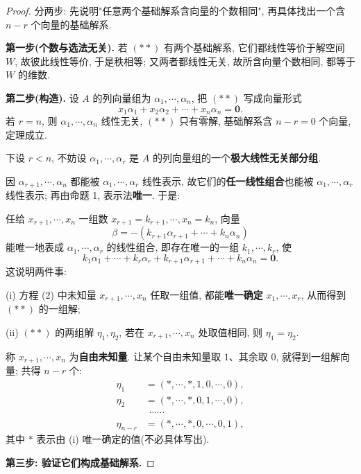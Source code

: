 \documentclass[UTF8,11pt]{ctexart}
\theoremstyle{cnthm}
\begin{document}
\begin{proof}
分两步: 先说明"任意两个基础解系含向量的个数相同", 再具体找出一个含 $n-r$ 个向量的基础解系.

\textbf{第一步(个数与选法无关).} 若 $(**)$ 有两个基础解系, 它们都线性等价于解空间 $W$, 故彼此线性等价, 于是秩相等; 又两者都线性无关, 故所含向量个数相同, 都等于 $W$ 的维数.

\textbf{第二步(构造).} 设 $A$ 的列向量组为 $\alpha_1,\cdots,\alpha_n$, 把 $(**)$ 写成向量形式
\begin{equation*}
x_1\alpha_1+x_2\alpha_2+\cdots+x_n\alpha_n=\mathbf 0 .\tag{2}
\end{equation*}
若 $r=n$, 则 $\alpha_1,\cdots,\alpha_n$ 线性无关, $(**)$ 只有零解, 基础解系含 $n-r=0$ 个向量, 定理成立.

下设 $r<n$, 不妨设 $\alpha_1,\cdots,\alpha_r$ 是 $A$ 的列向量组的一个\textbf{极大线性无关部分组}.

因 $\alpha_{r+1},\cdots,\alpha_n$ 都能被 $\alpha_1,\cdots,\alpha_r$ 线性表示, 故它们的\textbf{任一线性组合}也能被 $\alpha_1,\cdots,\alpha_r$ 线性表示; 再由命题 1, 表示法\textbf{唯一}. 于是:

任给 $x_{r+1},\cdots,x_n$ 一组数 $x_{r+1}=k_{r+1},\cdots,x_n=k_n$, 向量
\[
\beta=-(k_{r+1}\alpha_{r+1}+\cdots+k_n\alpha_n)
\]
能唯一地表成 $\alpha_1,\cdots,\alpha_r$ 的线性组合, 即存在唯一的一组 $k_1,\cdots,k_r$, 使
\[
k_1\alpha_1+\cdots+k_r\alpha_r+k_{r+1}\alpha_{r+1}+\cdots+k_n\alpha_n=\mathbf 0 .
\]
这说明两件事:

(i) 方程 (2) 中未知量 $x_{r+1},\cdots,x_n$ 任取一组值, 都能\textbf{唯一确定} $x_1,\cdots,x_r$, 从而得到 $(**)$ 的一组解;

(ii) $(**)$ 的两组解 $\eta_1,\eta_2$, 若在 $x_{r+1},\cdots,x_n$ 处取值相同, 则 $\eta_1=\eta_2$.

称 $x_{r+1},\cdots,x_n$ 为\textbf{自由未知量}. 让某个自由未知量取 $1$、其余取 $0$, 就得到一组解向量; 共得 $n-r$ 个:
\begin{equation*}
\begin{aligned}
\eta_1&=(*,\cdots,*,1,0,\cdots,0),\\
\eta_2&=(*,\cdots,*,0,1,\cdots,0),\\
&\ \ \cdots\cdots\\
\eta_{n-r}&=(*,\cdots,*,0,\cdots,0,1),
\end{aligned}\tag{3}
\end{equation*}
其中 $*$ 表示由 (i) 唯一确定的值(不必具体写出).

\textbf{第三步: 验证它们构成基础解系.}


\end{proof}
\end{document}

